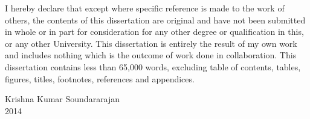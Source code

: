 
\begin{declaration} %

I hereby declare that except where specific reference is made to the work of others, the contents of this dissertation are original and have not been submitted in whole or in part for consideration for any other degree or qualification in this, or any other University.
This dissertation is entirely the result of my own work and includes nothing which is the outcome of work done in collaboration. This dissertation contains less than 65,000 words, excluding table of contents, tables, figures, titles, footnotes, references and appendices.

\flushright

Krishna Kumar Soundararajan\\
2014
\end{declaration}

